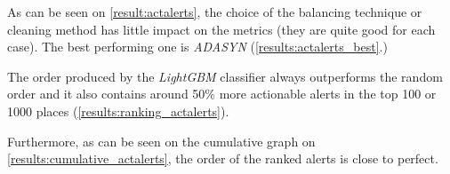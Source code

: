 As can be seen on \cref{result:actalerts}, the choice of the balancing technique or cleaning method has little impact on the metrics (they are quite good for each case). The best performing one is \textit{ADASYN} (\cref{results:actalerts_best}.) 

The order produced by the \textit{LightGBM} classifier always outperforms the random order and it also contains around 50\% more actionable alerts in the top 100 or 1000 places (\cref{results:ranking_actalerts}).

Furthermore, as can be seen on the cumulative graph on \cref{results:cumulative_actalerts}, the order of the ranked alerts is close to perfect.

